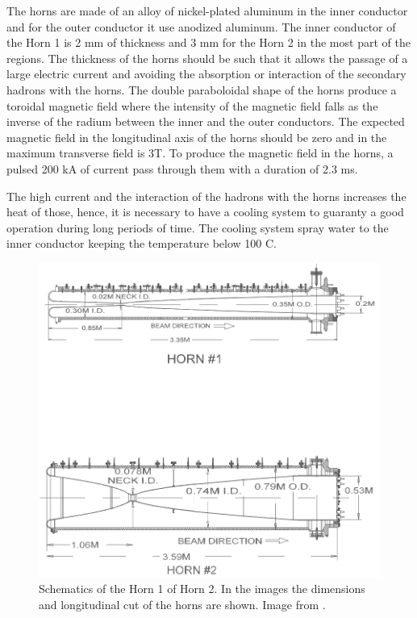 The horns are made of an alloy of nickel-plated aluminum in the inner conductor and for the outer conductor it use anodized aluminum. The inner conductor of the Horn 1 is 2 mm of thickness and 3 mm for the Horn 2 in the most part of the regions. The thickness of the horns should be such that it allows the passage of a large electric current and avoiding the absorption or interaction of the secondary hadrons with the horns. The double paraboloidal shape of the horns produce a toroidal magnetic field where the intensity of the magnetic field falls as the inverse of the radium between the inner and the outer conductors. The expected magnetic field in the longitudinal axis of the horns should be zero and in the maximum transverse field is 3T. To produce the magnetic field in the horns, a pulsed 200 kA of current pass through them with a duration of 2.3 ms.

The high current and the interaction of the hadrons with the horns increases the heat of those, hence, it is necessary to have a cooling system to guaranty a good operation during long periods of time. The cooling system spray water to the inner conductor keeping the temperature below 100 C. 

\begin{figure}[!htb]
\centering
\includegraphics[scale=0.33]{Figures/Chapter2/SchematicMagneticHorns.png}
        \caption{Schematics of the Horn 1 of Horn 2. In the images the dimensions and longitudinal cut of the horns are shown. Image from \cite{Numi}.} 
\label{fig:MnvExp:NuMI:NuMIHornsSchematic}
\end{figure}

